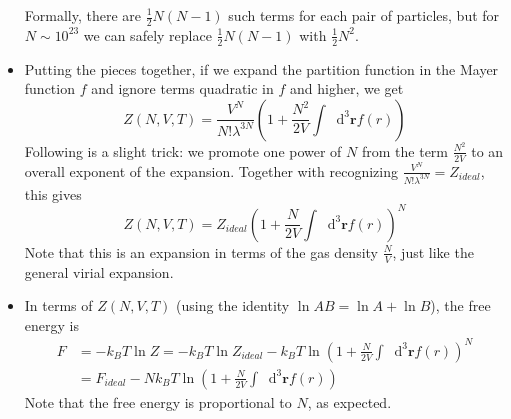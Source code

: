\documentclass[11pt, a4paper]{article}
\newcommand{\diff}{\mathop{}\!\mathrm{d}} %
\begin{document}
\begin{itemize}
	Formally, there are $ \frac{1}{2}N(N-1) $ such terms for each pair of particles, but for $ N \sim 10^{23} $ we can safely replace $ \frac{1}{2}N(N-1) $ with $ \frac{1}{2}N^{2} $. 
	
	\item Putting the pieces together, if we expand the partition function in the Mayer function $ f $ and ignore terms quadratic in $ f $ and higher, we get
	\begin{equation*}
		Z(N, V, T) = \frac{V^{N}}{N! \lambda^{3N}} \left(1 + \frac{N^{2}}{2V} \int \diff^{3}\bm{r} f(r) \right)
	\end{equation*}
	Following is a slight trick: we promote one power of $ N $ from the term $ \frac{N^{2}}{2V} $ to an overall exponent of the expansion. Together with recognizing $ \frac{V^{N}}{N! \lambda^{3N}} = Z_{ideal} $, this gives
	\begin{equation*}
		Z(N, V, T) = Z_{ideal} \left(1 + \frac{N}{2V} \int \diff^{3}\bm{r} f(r) \right)^{N}
	\end{equation*}
	Note that this is an expansion in terms of the gas density $ \frac{N}{V} $, just like the general virial expansion.
	
	\item In terms of $ Z(N, V, T) $ (using the identity $ \ln AB = \ln A + \ln B $), the free energy is
	\begin{align*}
		F &= -k_{B}T \ln Z = -k_{B}T\ln Z_{ideal} - k_{B}T\ln \left(1 + \frac{N}{2V} \int \diff^{3}\bm{r} f(r)\right)^{N} \\
		&=F_{ideal} - N k_{B}T \ln(1 + \frac{N}{2V} \int \diff^{3}\bm{r} f(r))
	\end{align*}
	Note that the free energy is proportional to $ N $, as expected.
\end{itemize}
\end{document}
